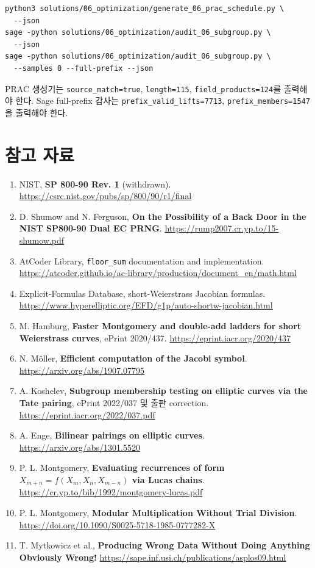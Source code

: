 \documentclass[10pt,a4paper]{article}
\begin{document}
\begin{lstlisting}
python3 solutions/06_optimization/generate_06_prac_schedule.py \
  --json
sage -python solutions/06_optimization/audit_06_subgroup.py \
  --json
sage -python solutions/06_optimization/audit_06_subgroup.py \
  --samples 0 --full-prefix --json
\end{lstlisting}

PRAC 생성기는 \texttt{source\_match=true},
\texttt{length=115}, \texttt{field\_products=124}를 출력해야 한다.
Sage full-prefix 감사는
\texttt{prefix\_valid\_lifts=7713},
\texttt{prefix\_members=1547}을 출력해야 한다.

\section{참고 자료}

\begingroup
\raggedright
\begin{enumerate}[leftmargin=6mm]
  \item NIST, \textbf{SP 800-90 Rev. 1} (withdrawn).
        \url{https://csrc.nist.gov/pubs/sp/800/90/r1/final}
  \item D. Shumow and N. Ferguson,
        \textbf{On the Possibility of a Back Door in the NIST SP800-90
        Dual EC PRNG}.
        \url{https://rump2007.cr.yp.to/15-shumow.pdf}
  \item AtCoder Library, \texttt{floor\_sum} documentation and
        implementation.
        \url{https://atcoder.github.io/ac-library/production/document_en/math.html}
  \item Explicit-Formulas Database,
        short-Weierstrass Jacobian formulas.
        \url{https://www.hyperelliptic.org/EFD/g1p/auto-shortw-jacobian.html}
  \item M. Hamburg,
        \textbf{Faster Montgomery and double-add ladders for short
        Weierstrass curves}, ePrint 2020/437.
        \url{https://eprint.iacr.org/2020/437}
  \item N. Möller, \textbf{Efficient computation of the Jacobi symbol}.
        \url{https://arxiv.org/abs/1907.07795}
  \item A. Koshelev,
        \textbf{Subgroup membership testing on elliptic curves via the
        Tate pairing}, ePrint 2022/037 및 출판 correction.
        \url{https://eprint.iacr.org/2022/037.pdf}
  \item A. Enge, \textbf{Bilinear pairings on elliptic curves}.
        \url{https://arxiv.org/abs/1301.5520}
  \item P. L. Montgomery,
        \textbf{Evaluating recurrences of form
        \(X_{m+n}=f(X_m,X_n,X_{m-n})\) via Lucas chains}.
        \url{https://cr.yp.to/bib/1992/montgomery-lucas.pdf}
  \item P. L. Montgomery,
        \textbf{Modular Multiplication Without Trial Division}.
        \url{https://doi.org/10.1090/S0025-5718-1985-0777282-X}
  \item T. Mytkowicz et al.,
        \textbf{Producing Wrong Data Without Doing Anything Obviously Wrong!}
        \url{https://sape.inf.usi.ch/publications/asplos09.html}
\end{enumerate}
\endgroup
\end{document}
